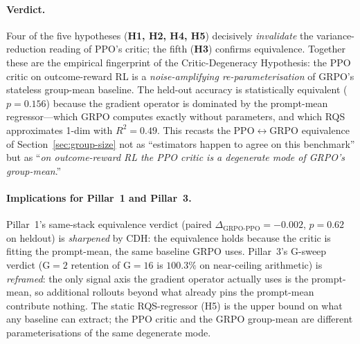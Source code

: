 \paragraph{Verdict.}
Four of the five hypotheses (\textbf{H1, H2, H4, H5}) decisively
\emph{invalidate} the variance-reduction reading of PPO's critic; the
fifth (\textbf{H3}) confirms equivalence. Together these are the
empirical fingerprint of the Critic-Degeneracy Hypothesis: the PPO
critic on outcome-reward RL is a \emph{noise-amplifying re-parameterisation}
of GRPO's stateless group-mean baseline. The held-out accuracy is
statistically equivalent ($p{=}0.156$) because the gradient operator
is dominated by the prompt-mean regressor---which GRPO computes
exactly without parameters, and which RQS approximates 1-dim with
$R^2{=}0.49$. This recasts the PPO$\leftrightarrow$GRPO equivalence
of Section~\ref{sec:group-size} not as ``estimators happen to agree
on this benchmark'' but as ``\emph{on outcome-reward RL the PPO
critic is a degenerate mode of GRPO's group-mean}.''

\paragraph{Implications for Pillar~1 and Pillar~3.}
Pillar~1's same-stack equivalence verdict (paired
$\Delta_{\text{GRPO-PPO}} = -0.002$, $p{=}0.62$ on heldout) is
\emph{sharpened} by CDH: the equivalence holds because the critic
is fitting the prompt-mean, the same baseline GRPO uses. Pillar~3's
G-sweep verdict (G${=}2$ retention of G${=}16$ is $100.3\%$ on
near-ceiling arithmetic) is \emph{reframed}: the only signal axis
the gradient operator actually uses is the prompt-mean, so
additional rollouts beyond what already pins the prompt-mean
contribute nothing. The static RQS-regressor (H5) is the upper bound
on what any baseline can extract; the PPO critic and the GRPO
group-mean are different parameterisations of the same degenerate
mode.